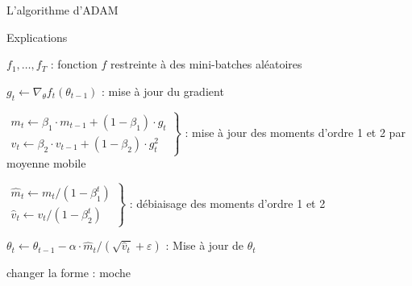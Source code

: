 \documentclass[11pt,aspectratio=169,xcolor=dvipsnames, french]{beamer}
\begin{document}
\begin{frame}{L'algorithme d'ADAM}
\begin{center}
\end{center}
\end{frame}

\begin{frame}{Explications}

$f_1,\ldots, f_T$ : fonction $f$ restreinte à des mini-batches aléatoires \\

\pause

$g_t \longleftarrow \nabla_{\theta}f_t(\theta_{t-1})$ : mise à jour du gradient \\

 \pause
 
$\left.
\begin{array}{ll}
 m_t \longleftarrow \beta_1\cdotp m_{t-1}+(1-\beta_1)\cdotp g_t \\  
v_t \longleftarrow \beta_2\cdotp v_{t-1}+(1-\beta_2)\cdotp g_t^2   
\end{array}
\right\rbrace$ : mise à jour des moments d'ordre 1 et 2 par moyenne mobile \\


 
 

\pause

$\left.
\begin{array}{ll}
\widehat m_t \longleftarrow m_t/(1-\beta_1^t) \\ 
  \widehat v_t \longleftarrow v_t/(1-\beta_2^t)      
\end{array}
\right\rbrace$ : débiaisage des moments d'ordre 1 et 2 

 \pause

 $\theta_t \longleftarrow \theta_{t-1}-\alpha\cdotp \widehat m_t/(\sqrt{\widehat v_t}+\varepsilon)$ : Mise à jour de $\theta_t$
 
 changer la forme : moche

\end{frame}
\end{document}
